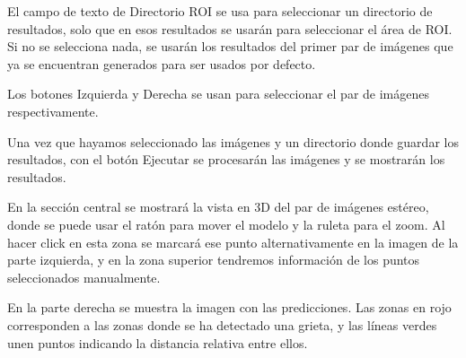 El campo de texto de Directorio ROI se usa para seleccionar un directorio de resultados, solo que en esos resultados se usarán para seleccionar el área de ROI. Si no se selecciona nada, se usarán los resultados del primer par de imágenes que ya se encuentran generados para ser usados por defecto.

Los botones Izquierda y Derecha se usan para seleccionar el par de imágenes respectivamente.

Una vez que hayamos seleccionado las imágenes y un directorio donde guardar los resultados, con el botón Ejecutar se procesarán las imágenes y se mostrarán los resultados.


En la sección central se mostrará la vista en 3D del par de imágenes estéreo, donde se puede usar el ratón para mover el modelo y la ruleta para el zoom. Al hacer click en esta zona se marcará ese punto alternativamente en la imagen de la parte izquierda, y en la zona superior tendremos información de los puntos seleccionados manualmente.

En la parte derecha se muestra la imagen con las predicciones. Las zonas en rojo corresponden a las zonas donde se ha detectado una grieta, y las líneas verdes unen puntos indicando la distancia relativa entre ellos.

